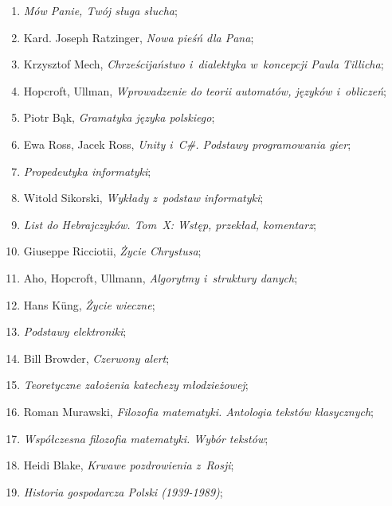 \documentclass[a4paper,11pt]{article}
\begin{document}
\begin{enumerate}
\item \textit{Mów Panie, Twój sługa słucha};

\item Kard. Joseph Ratzinger, \textit{Nowa pieśń dla Pana};

\item Krzysztof Mech, \textit{Chrześcijaństwo i~dialektyka w~koncepcji
    Paula Tillicha};

\item Hopcroft, Ullman, \textit{Wprowadzenie do teorii automatów, języków
    i~obliczeń};

\item Piotr Bąk, \textit{Gramatyka języka polskiego};

\item Ewa Ross, Jacek Ross, \textit{Unity i~C\#. Podstawy programowania
    gier};

\item \textit{Propedeutyka informatyki};

\item Witold Sikorski, \textit{Wykłady z~podstaw informatyki};

\item \textit{List do Hebrajczyków. Tom~X: Wstęp, przekład, komentarz};

\item Giuseppe Ricciotii, \textit{Życie Chrystusa};

\item Aho, Hopcroft, Ullmann, \textit{Algorytmy i~struktury danych};

\item Hans K\"{u}ng, \textit{Życie wieczne};

\item \textit{Podstawy elektroniki};

\item Bill Browder, \textit{Czerwony alert};

\item \textit{Teoretyczne założenia katechezy młodzieżowej};

\item Roman Murawski, \textit{Filozofia matematyki. Antologia tekstów
    klasycznych};

\item \textit{Współczesna filozofia matematyki. Wybór tekstów};

\item Heidi Blake, \textit{Krwawe pozdrowienia z~Rosji};

\item \textit{Historia gospodarcza Polski (1939-1989)};


\end{enumerate}
\end{document}
